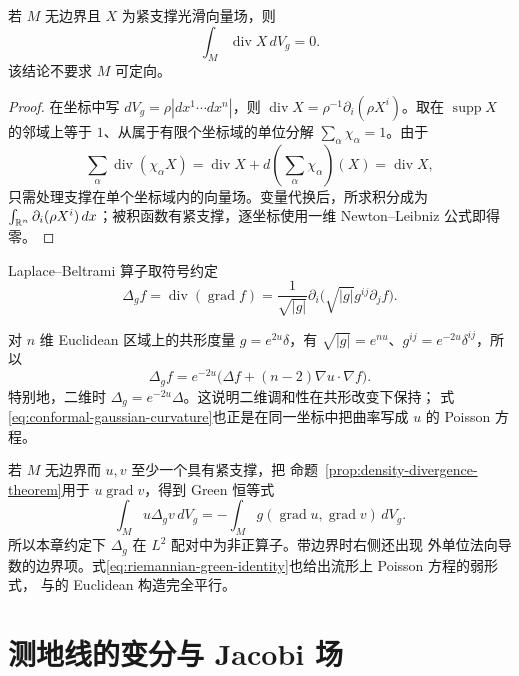 \begin{proposition}[密度形式的散度定理]\label{prop:density-divergence-theorem}
若 $M$ 无边界且 $X$ 为紧支撑光滑向量场，则
\[
 \int_M\operatorname{div}X\,dV_g=0.
\]
该结论不要求 $M$ 可定向。
\end{proposition}
\begin{proof}
在坐标中写 $dV_g=\rho|dx^1\cdots dx^n|$，则
$\operatorname{div}X=\rho^{-1}\partial_i(\rho X^i)$。取在
$\operatorname{supp}X$ 的邻域上等于 $1$、从属于有限个坐标域的单位分解
$\sum_\alpha\chi_\alpha=1$。由于
\[
 \sum_\alpha\operatorname{div}(\chi_\alpha X)
 =\operatorname{div}X+
 d\!\left(\sum_\alpha\chi_\alpha\right)(X)
 =\operatorname{div}X,
\]
只需处理支撑在单个坐标域内的向量场。变量代换后，所求积分成为
$\int_{\mathbb{R}^n}\partial_i(\rho X^i)\,dx$；被积函数有紧支撑，逐坐标使用一维
Newton--Leibniz 公式即得零。
\end{proof}

Laplace--Beltrami 算子取符号约定
\begin{equation}\label{eq:laplace-beltrami-coordinate}
 \Delta_gf=\operatorname{div}(\operatorname{grad}f)
 =\frac1{\sqrt{|g|}}\partial_i
 \bigl(\sqrt{|g|}g^{ij}\partial_jf\bigr).
\end{equation}

对 $n$ 维 Euclidean 区域上的共形度量 $g=e^{2u}\delta$，有
$\sqrt{|g|}=e^{nu}$、$g^{ij}=e^{-2u}\delta^{ij}$，所以
\begin{equation}\label{eq:conformal-laplace-beltrami}
 \Delta_gf=e^{-2u}
 \bigl(\Delta f+(n-2)\nabla u\mathbin{\cdot}\nabla f\bigr).
\end{equation}
特别地，二维时 $\Delta_g=e^{-2u}\Delta$。这说明二维调和性在共形改变下保持；
式\eqref{eq:conformal-gaussian-curvature}也正是在同一坐标中把曲率写成 $u$ 的
Poisson 方程。

若 $M$ 无边界而 $u,v$ 至少一个具有紧支撑，把
命题~\ref{prop:density-divergence-theorem}用于 $u\operatorname{grad}v$，得到 Green
恒等式
\begin{equation}\label{eq:riemannian-green-identity}
 \int_Mu\Delta_gv\,dV_g
 =-\int_Mg(\operatorname{grad}u,\operatorname{grad}v)\,dV_g.
\end{equation}
所以本章约定下 $\Delta_g$ 在 $L^2$ 配对中为非正算子。带边界时右侧还出现
外单位法向导数的边界项。式\eqref{eq:riemannian-green-identity}也给出流形上 Poisson 方程的弱形式，
与的 Euclidean 构造完全平行。

\section{测地线的变分与 Jacobi 场}

